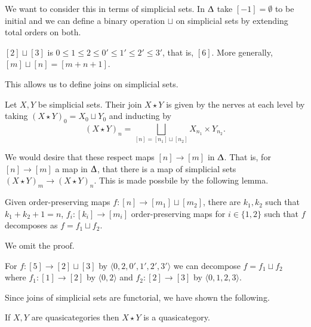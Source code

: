 We want to consider this in terms of simplicial sets. In $\Updelta$ take $[-1]=\emptyset$ to be initial and we can define a binary operation $\sqcup$ on simplicial sets by extending total orders on both. 
\begin{example}
  $[2]\sqcup[3]$ is $0\leq 1\leq 2\leq 0'\leq 1'\leq 2'\leq 3'$, that is, $[6]$. More generally, $[m]\sqcup [n]=[m+n+1]$. 
\end{example}
This allows us to define joins on simplicial sets. 
\begin{definition}
  Let $X,Y$ be simplicial sets. Their join $X\star Y$ is given by the nerves at each level by taking $(X\star Y)_{0}=X_{0}\sqcup Y_{0}$ and inducting by 
  $$(X\star Y)_{n}=\bigsqcup_{[n]=[n_{1}]\sqcup[n_{2}]}X_{n_{1}}\times Y_{n_{2}}.$$
\end{definition}
We would desire that these respect maps $[n]\to[m]$ in $\Updelta$. That is, for $[n]\to[m]$ a map in $\Updelta$, that there is a map of simplicial sets $(X\star Y)_{m}\to (X\star Y)_{n}$. This is made possbile by the following lemma. 
\begin{lemma}
  Given order-preserving maps $f:[n]\to[m_{1}]\sqcup [m_{2}]$, there are $k_{1},k_{2}$ such that $k_{1}+k_{2}+1=n$, $f_{i}:[k_{i}]\to[m_{i}]$ order-preserving maps for $i\in\{1,2\}$ such that $f$ decomposes as $f=f_{1}\sqcup f_{2}$. 
\end{lemma}
We omit the proof. 
\begin{example}
  For $f:[5]\to[2]\sqcup [3]$ by $\langle 0,2,0',1',2',3'\rangle$ we can decompose $f=f_{1}\sqcup f_{2}$ where $f_{1}:[1]\to[2]$ by $\langle 0,2\rangle$ and $f_{2}:[2]\to[3]$ by $\langle 0,1,2,3\rangle$. 
\end{example}
Since joins of simplicial sets are functorial, we have shown the following. 
\begin{proposition}
  If $X,Y$ are quasicategories then $X\star Y$ is a quasicategory. 
\end{proposition}